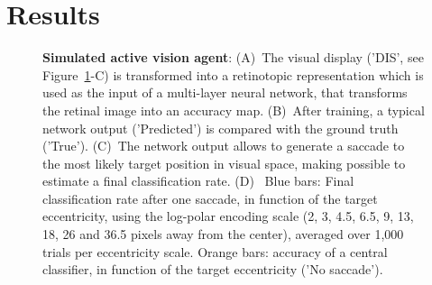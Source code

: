 \section{Results}
\label{sec:results}



\begin{figure}%
\caption{
{\bf Simulated active vision agent}: 
(A)~The visual display ('DIS', see  Figure~\ref{fig:results}-C)  is transformed into a retinotopic representation which is used as the input of a multi-layer neural network, that transforms the retinal image into an accuracy map. (B)~After training, a typical network output  ('Predicted') is compared  with the ground truth ('True'). (C)~The network output allows to generate a saccade to the most likely target position in visual space, making possible to estimate a final classification rate. (D)~ Blue bars: Final classification rate after one saccade, in function of the target eccentricity, using the log-polar encoding scale (2, 3, 4.5, 6.5, 9, 13, 18, 26 and 36.5 pixels away from the center), averaged over 1,000 trials per eccentricity scale. Orange bars: accuracy of a central classifier, in function of the target eccentricity ('No saccade').
\label{fig:results}}%
\end{figure}%

